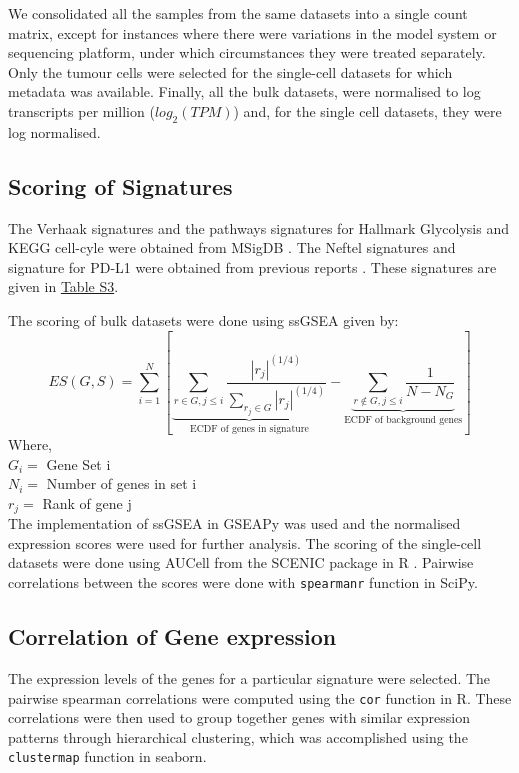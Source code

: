 \documentclass[11pt,a4paper]{article}
\begin{document}
We consolidated all the samples from the same datasets into a single count matrix, except for instances where there were variations in the model system or sequencing platform, under which circumstances they were treated separately. Only the tumour cells were selected for the single-cell datasets for which metadata was available. Finally, all the bulk datasets, were normalised to log transcripts per million ($log_2(TPM)$) and, for the single cell datasets, they were log normalised. 

\subsection{Scoring of Signatures}
The Verhaak signatures and the pathways signatures for Hallmark Glycolysis and KEGG cell-cyle were obtained from MSigDB \parencite{msigdb}. The Neftel signatures and signature for PD-L1 were obtained from previous reports \parencite{Neftel, pdl1}. These signatures are given in \href{file://./Supplementary/TableS3.csv}{Table S3}.

The scoring of bulk datasets were done using ssGSEA \parencite{ssgsea} given by:
\begin{equation}
ES(G,S) = \sum_{i=1}^N \left[ \underbrace{\sum_{r\in G, j\le i}\frac{|r_j|^{(1/4)}}{\sum_{r_j\in G}|r_j|^{(1/4)}}}_{\text{ECDF of genes in signature}} - \underbrace{\sum_{r\notin G, j\le i} \frac{1}{N - N_G}}_{\text{ECDF of background genes}}\right]
\label{ssgsea_eqn} 
\end{equation}
Where,\\
$G_i =$ Gene Set i\\
$N_i =$ Number of genes in set i\\
$r_j =$ Rank of gene j\\

The implementation of ssGSEA in GSEAPy \parencite{gseapy} was used and the normalised expression scores were used for further analysis. The scoring of the single-cell datasets were done using AUCell from the SCENIC package in R \parencite{aucell}. Pairwise correlations between the scores were done with \texttt{spearmanr} function in SciPy. 

\subsection{Correlation of Gene expression}
The expression levels of the genes for a particular signature were selected. The pairwise spearman correlations were computed using the \texttt{cor} function in R. These correlations were then used to group together genes with similar expression patterns through hierarchical clustering, which was accomplished using the \texttt{clustermap} function in seaborn.
\end{document}
